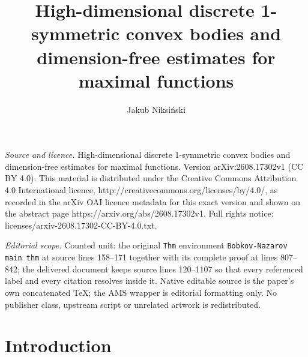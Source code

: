 \documentclass[10pt,a4paper]{amsart}
\numberwithin{equation}{section}
\begin{document}
\title[High-dimensional discrete 1-symmetric convex bodies and dime]{High-dimensional discrete 1-symmetric convex bodies and dimension-free estimates for maximal functions}
\author{Jakub Niksiński}
\date{}
\maketitle
\noindent\emph{Source and licence.} High-dimensional discrete 1-symmetric convex bodies and dimension-free estimates for maximal functions. Version arXiv:2608.17302v1 (CC BY 4.0). This material is distributed under the Creative Commons Attribution 4.0 International licence, http://creativecommons.org/licenses/by/4.0/, as recorded in the arXiv OAI licence metadata for this exact version and shown on the abstract page https://arxiv.org/abs/2608.17302v1. Full rights notice: licenses/arxiv-2608.17302-CC-BY-4.0.txt.\par\smallskip
\noindent\textit{Editorial scope.} Counted unit: the original \texttt{Thm} environment \texttt{Bobkov-Nazarov main thm} at source lines 158--171 together with its complete proof at lines 807--842; the delivered document keeps source lines 120--1107 so that every referenced label and every citation resolves inside it. Native editable source is the paper's own concatenated TeX; the AMS wrapper is editorial formatting only. No publisher class, upstream script or unrelated artwork is redistributed.
\section{Introduction}
\end{document}
